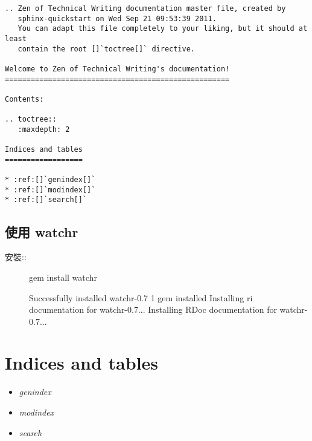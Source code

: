 \documentclass[a4paper,12pt,english]{sphinxmanual}
\begin{document}
\begin{Verbatim}[commandchars=@\[\]]
.. Zen of Technical Writing documentation master file, created by
   sphinx-quickstart on Wed Sep 21 09:53:39 2011.
   You can adapt this file completely to your liking, but it should at least
   contain the root []`toctree[]` directive.

Welcome to Zen of Technical Writing's documentation!
====================================================

Contents:

.. toctree::
   :maxdepth: 2

Indices and tables
==================

* :ref:[]`genindex[]`
* :ref:[]`modindex[]`
* :ref:[]`search[]`
\end{Verbatim}


\section{使用 watchr}
\label{sphinx_watchr::doc}\label{sphinx_watchr:watchr}\begin{description}
\item[{安裝::}] \leavevmode
gem install watchr

Successfully installed watchr-0.7
1 gem installed
Installing ri documentation for watchr-0.7...
Installing RDoc documentation for watchr-0.7...

\end{description}


\chapter{Indices and tables}
\label{index:indices-and-tables}\begin{itemize}
\item {} 
\emph{genindex}

\item {} 
\emph{modindex}

\item {} 
\emph{search}

\end{itemize}



\renewcommand{\indexname}{Index}
\printindex
\end{document}
